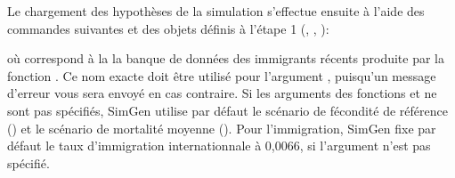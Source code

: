\documentclass[letterpaper,10pt,french]{sphinxmanual}
\begin{document}
\begin{DUlineblock}{0em}
\item[] 
\end{DUlineblock}

Le chargement des hypothèses de la simulation s’effectue ensuite à l’aide des commandes suivantes et des objets définis à l’étape 1 (, , ):

\begin{sphinxVerbatim}[commandchars=\\\{\}]
 
\end{sphinxVerbatim}

où  correspond à la la banque de données des immigrants récents produite par la fonction .
Ce nom exacte doit être utilisé pour l’argument , puisqu’un message d’erreur vous sera envoyé en cas contraire.
Si les arguments  des fonctions  et  ne sont pas spécifiés, SimGen utilise par défaut le scénario de fécondité de référence ()
et le scénario de mortalité moyenne ().
Pour l’immigration, SimGen fixe par défaut le taux d’immigration internationnale à 0,0066, si l’argument  n’est pas spécifié.

\end{document}

